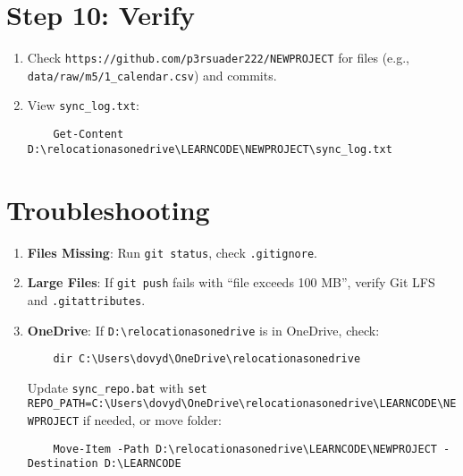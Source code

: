 \documentclass[a4paper,12pt]{article}
\begin{document}
\section{Step 10: Verify}
\begin{enumerate}[label=\arabic*.]
    \item Check \texttt{https://github.com/p3rsuader222/NEWPROJECT} for files (e.g., \texttt{data/raw/m5/1\_calendar.csv}) and commits.
    \item View \texttt{sync\_log.txt}:
    \begin{verbatim}
    Get-Content D:\relocationasonedrive\LEARNCODE\NEWPROJECT\sync_log.txt
    \end{verbatim}
\end{enumerate}

\section{Troubleshooting}
\begin{enumerate}[label=\arabic*.]
    \item \textbf{Files Missing}: Run \texttt{git status}, check \texttt{.gitignore}.
    \item \textbf{Large Files}: If \texttt{git push} fails with ``file exceeds 100 MB'', verify Git LFS and \texttt{.gitattributes}.
    \item \textbf{OneDrive}: If \texttt{D:\textbackslash relocationasonedrive} is in OneDrive, check:
    \begin{verbatim}
    dir C:\Users\dovyd\OneDrive\relocationasonedrive
    \end{verbatim}
    Update \texttt{sync\_repo.bat} with \texttt{set REPO\_PATH=C:\textbackslash Users\textbackslash dovyd\textbackslash OneDrive\textbackslash relocationasonedrive\textbackslash LEARNCODE\textbackslash NEWPROJECT} if needed, or move folder:
    \begin{verbatim}
    Move-Item -Path D:\relocationasonedrive\LEARNCODE\NEWPROJECT -Destination D:\LEARNCODE
    \end{verbatim}
\end{enumerate}

\end{document}
